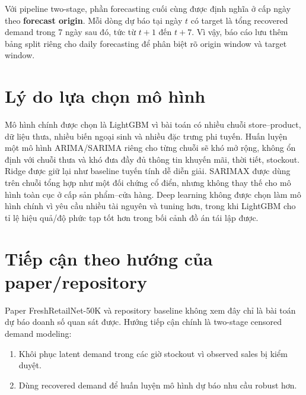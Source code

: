 \documentclass[12pt,a4paper]{article}
\begin{document}
Với pipeline two-stage, phần forecasting cuối cùng được định nghĩa ở cấp ngày theo \textbf{forecast origin}.
Mỗi dòng dự báo tại ngày $t$ có target là tổng recovered demand trong 7 ngày sau đó, tức từ $t+1$ đến $t+7$.
Vì vậy, báo cáo lưu thêm bảng split riêng cho daily forecasting để phân biệt rõ origin window và target window.

\begin{table}[H]
\centering
\caption{Chia tập cho daily 7-day forecasting theo forecast origin}
\end{table}

\section{Lý do lựa chọn mô hình}
Mô hình chính được chọn là LightGBM vì bài toán có nhiều chuỗi store--product, dữ liệu thưa, nhiều biến ngoại sinh và nhiều đặc trưng phi tuyến.
Huấn luyện một mô hình ARIMA/SARIMA riêng cho từng chuỗi sẽ khó mở rộng, không ổn định với chuỗi thưa và khó đưa đầy đủ thông tin khuyến mãi, thời tiết, stockout.
Ridge được giữ lại như baseline tuyến tính dễ diễn giải.
SARIMAX được dùng trên chuỗi tổng hợp như một đối chứng cổ điển, nhưng không thay thế cho mô hình toàn cục ở cấp sản phẩm--cửa hàng.
Deep learning không được chọn làm mô hình chính vì yêu cầu nhiều tài nguyên và tuning hơn, trong khi LightGBM cho tỉ lệ hiệu quả/độ phức tạp tốt hơn trong bối cảnh đồ án tái lập được.

\section{Tiếp cận theo hướng của paper/repository}
Paper FreshRetailNet-50K và repository baseline không xem đây chỉ là bài toán dự báo doanh số quan sát được.
Hướng tiếp cận chính là two-stage censored demand modeling:
\begin{enumerate}
    \item Khôi phục latent demand trong các giờ stockout vì observed sales bị kiểm duyệt.
    \item Dùng recovered demand để huấn luyện mô hình dự báo nhu cầu robust hơn.
\end{enumerate}
\end{document}
